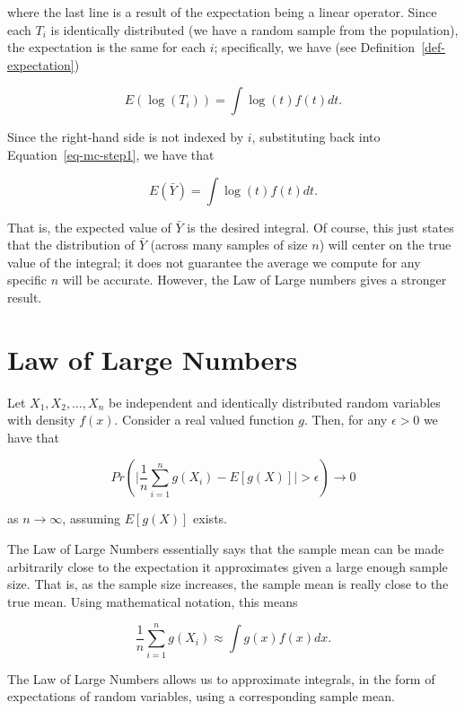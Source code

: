 \documentclass[
  letterpaper,
  DIV=11,
  numbers=noendperiod]{scrreprt}
\theoremstyle{definition}
\theoremstyle{definition}
\theoremstyle{plain}
\theoremstyle{remark}
\begin{document}
where the last line is a result of the expectation being a linear
operator. Since each \(T_i\) is identically distributed (we have a
random sample from the population), the expectation is the same for each
\(i\); specifically, we have (see Definition~\ref{def-expectation})

\[E\left(\log\left(T_i\right)\right) = \int \log(t) f(t) dt.\]

Since the right-hand side is not indexed by \(i\), substituting back
into Equation~\ref{eq-mc-step1}, we have that

\[E\left(\bar{Y}\right) = \int \log(t) f(t) dt.\]

That is, the expected value of \(\bar{Y}\) is the desired integral. Of
course, this just states that the distribution of \(\bar{Y}\) (across
many samples of size \(n\)) will center on the true value of the
integral; it does not guarantee the average we compute for any specific
\(n\) will be accurate. However, the Law of Large numbers gives a
stronger result.

\hypertarget{law-of-large-numbers}{%
\section{Law of Large Numbers}\label{law-of-large-numbers}}

Let \(X_1, X_2,\dotsc, X_n\) be independent and identically distributed
random variables with density \(f(x)\). Consider a real valued function
\(g\). Then, for any \(\epsilon > 0\) we have that

\[Pr\left(\lvert\frac{1}{n}\sum_{i=1}^n g\left(X_i\right) - E\left[g(X)\right]\rvert > \epsilon\right) \rightarrow 0\]

as \(n \rightarrow \infty\), assuming \(E\left[g(X)\right]\) exists.

The Law of Large Numbers essentially says that the sample mean can be
made arbitrarily close to the expectation it approximates given a large
enough sample size. That is, as the sample size increases, the sample
mean is really close to the true mean. Using mathematical notation, this
means

\[\frac{1}{n} \sum_{i=1}^{n} g\left(X_i\right) \approx \int g(x) f(x) dx.\]

\begin{tcolorbox}[enhanced jigsaw, arc=.35mm, bottomtitle=1mm, colback=white, rightrule=.15mm, titlerule=0mm, opacityback=0, breakable, colbacktitle=quarto-callout-tip-color!10!white, toprule=.15mm, left=2mm, leftrule=.75mm, toptitle=1mm, title=\textcolor{quarto-callout-tip-color}{\faLightbulb}\hspace{0.5em}{Big Idea}, opacitybacktitle=0.6, bottomrule=.15mm, colframe=quarto-callout-tip-color-frame, coltitle=black]

The Law of Large Numbers allows us to approximate integrals, in the form
of expectations of random variables, using a corresponding sample mean.

\end{tcolorbox}
\end{document}
